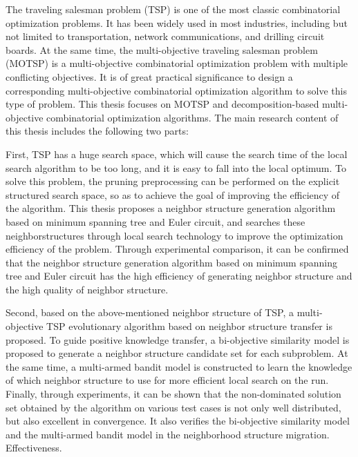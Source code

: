 \begin{abstractEn}
\label{abstractEn} 
    The traveling salesman problem (TSP) is one of the most classic combinatorial optimization problems. It has been widely used in most industries, including but not limited to transportation, network communications, and drilling circuit boards. At the same time, the multi-objective traveling salesman problem (MOTSP) is a multi-objective combinatorial optimization problem with multiple conflicting objectives. It is of great practical significance to design a corresponding multi-objective combinatorial optimization algorithm to solve this type of problem. This thesis focuses on MOTSP ​​and decomposition-based multi-objective combinatorial optimization algorithms.
    The main research content of this thesis includes the following two parts:
    \par
    First, TSP has a huge search space, which will cause the search time of the local search algorithm to be too long, and it is easy to fall into the local optimum. To solve this problem, the pruning preprocessing can be performed on the explicit structured search space, so as to achieve the goal of improving the efficiency of the algorithm. This thesis proposes a neighbor structure generation algorithm based on minimum spanning tree and Euler circuit, and searches these neighborstructures through local search technology to improve the optimization efficiency of the problem. Through experimental comparison, it can be confirmed that the neighbor structure generation algorithm based on minimum spanning tree and Euler circuit has the high efficiency of generating neighbor structure and the high quality of neighbor structure.
    \par
    Second, based on the above-mentioned neighbor structure of TSP, a multi-objective TSP evolutionary algorithm based on neighbor structure transfer is proposed. To guide positive knowledge transfer, a bi-objective similarity model is proposed to generate a neighbor structure candidate set for each subproblem. At the same time, a multi-armed bandit model is constructed to learn the knowledge of which neighbor structure to use for more efficient local search on the run. Finally, through experiments, it can be shown that the non-dominated solution set obtained by the algorithm on various test cases is not only well distributed, but also excellent in convergence. It also verifies the bi-objective similarity model and the multi-armed bandit model in the neighborhood structure migration. Effectiveness.
\end{abstractEn}
